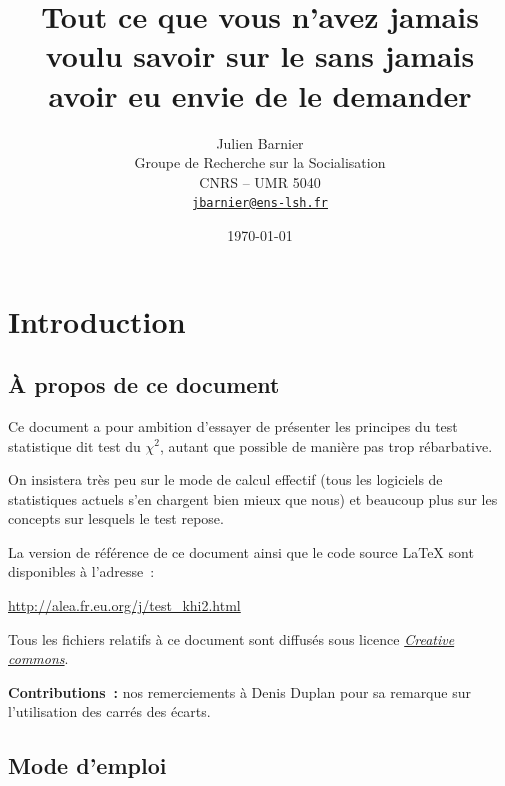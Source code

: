 \documentclass[a4paper,10pt,twoside,francais]{report}
\title{Tout ce que vous n'avez jamais voulu savoir sur le \chid sans
  jamais avoir eu envie de le demander}
\author{Julien Barnier\\ Groupe de Recherche sur la Socialisation\\
  CNRS -- UMR 5040\\ \href{mailto:jbarnier@ens-lsh.fr}{\texttt{jbarnier@ens-lsh.fr}}}
\date{\today{}}
\newcommand{\chid}{$\chi^2$\xspace}
\begin{document}
\renewcommand\chaptername{Partie}

\maketitle
\thispagestyle{empty}

\pagestyle{fancy} 
\renewcommand{\chaptermark}[1]{\markboth{#1}{}}
\renewcommand{\sectionmark}[1]{\markright{\thesection.\ #1}}
\fancyhead{}
\fancyhead[RO,LE]{\thepage}
\fancyhead[RE]{\nouppercase{\leftmark}}
\fancyhead[LO]{\nouppercase{\rightmark}}
\fancyfoot{}

\tableofcontents


\sloppy

\setlength{\parskip}{1.5ex}


\chapter{Introduction}

\section{À propos de ce document}

Ce document a pour ambition d'essayer de présenter les principes du
test statistique dit \og test du \chid \fg{}, autant que possible de
manière pas trop rébarbative.

On insistera très peu sur le mode de calcul effectif (tous les
logiciels de statistiques actuels s'en chargent bien mieux que nous)
et beaucoup plus sur les concepts sur lesquels le test repose.

La version de référence de ce document ainsi que le code source
\LaTeX{} sont disponibles à l'adresse~:

\url{http://alea.fr.eu.org/j/test_khi2.html}

Tous les fichiers relatifs à ce document sont diffusés sous licence
\href{http://creativecommons.org/licenses/by/2.0/fr/}{\textit{Creative commons}}.

\textbf{Contributions~: } nos remerciements à Denis Duplan pour sa
remarque sur l'utilisation des carrés des écarts.

\section{Mode d'emploi}
\end{document}
